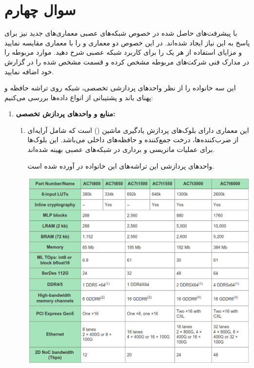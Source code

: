 \section{سوال چهارم}
با پیشرفت‌های حاصل شده در خصوص شبکه‌های عصبی معماری‌های  جدید نیز برای پاسخ به این نیاز ایجاد شده‌اند. در این خصوص دو معماری  و  را با معماری  مقایسه نمایید و مزایای استفاده از هر یک را برای کاربرد شبکه عصبی شرح دهید. موارد مربوطه را در مدارک فنی شرکت‌های مربوطه مشخص کرده و قسمت مشخص شده را در گزارش خود اضافه نمایید.


\begin{qsolve}
	این سه خانواده را از نظر واحد‌های پردازشی تخصصی، شبکه روی تراشه حافظه و پهنای باند و پشتیبانی از انواع داده‌ها بررسی می‌کنیم:
	
	
	
	\begin{enumerate}
		\item 
		\textbf{منابع و واحدهای پردازش تخصصی:}
		
		\begin{enumerate}
			\item 
			 این معماری دارای بلوک‌های پردازش یادگیری ماشین () است که شامل آرایه‌ای از ضرب‌کننده‌ها، درخت جمع‌کننده و حافظه‌های داخلی می‌باشد. این بلوک‌ها برای عملیات ماتریسی و برداری در شبکه‌های عصبی بهینه شده‌اند. \cite{ref1}
			
			واحد‌های پردازشی این تراشه‌های این خانواده در \cite{ref1} آورده شده است.
			
			\begin{center}
				\includegraphics*[width=1\linewidth]{pics/img17.png}
				\label{واحد‌های پردازشی موجود در Speedster7t}
			\end{center}
		\end{enumerate}
	\end{enumerate}
\end{qsolve}








